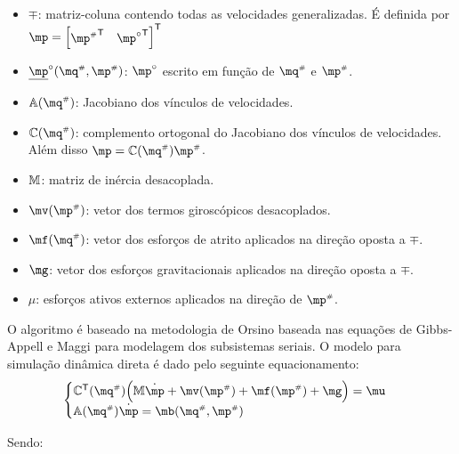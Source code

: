 \documentclass[a4paper,11pt,brazil,fleqn]{article}
\begin{document}
\begin{itemize}
\item $\mp$: matriz-coluna contendo todas as velocidades generalizadas. \'E definida por $\mp = \begin{bmatrix} {\mp\ssh}^\msT & {\mp\cir}^\msT \end{bmatrix}^\msT $
\item $\underline{\mp}\cir(\mq\ssh,\mp\ssh)$: $\mp\cir$ escrito em fun\c{c}\~ao de $\mq\ssh$ e $\mp\ssh$.
\item $\mA(\mq\ssh)$: Jacobiano dos v\'inculos de velocidades.
\item $\mC(\mq\ssh)$: complemento ortogonal do Jacobiano dos v\'inculos de velocidades. Al\'em disso $\mp = \mC(\mq\ssh) \mp\ssh$.
\item $\mathbb{M}$: matriz de in\'ercia desacoplada.
\item $\mv(\mp\ssh)$: vetor dos termos girosc\'opicos desacoplados.
\item $\mf(\mq\ssh)$: vetor dos esfor\c{c}os de atrito aplicados na dire\c{c}\~ao oposta a $\mp$.
\item $\mg$: vetor dos esfor\c{c}os gravitacionais aplicados na dire\c{c}\~ao oposta a $\mp$.
\item $\mu $: esfor\c{c}os ativos externos aplicados na dire\c{c}\~ao de $\mp\ssh$.

\end{itemize}

O algoritmo \'e baseado na metodologia de Orsino baseada nas equa\c{c}\~oes de Gibbs-Appell e Maggi para modelagem dos subsistemas seriais. O modelo para simula\c{c}\~ao din\^amica direta \'e dado pelo seguinte equacionamento:
\begin{equation} \label{eq:DinamicaDireta}
\begin{cases}
\mC^\mathsf{T}(\mq\ssh) \Big( \mM \dot{\mp} + \mv(\mp\ssh) + \mf(\mp\ssh) + \mg \Big) = \mu \\
\mA(\mq\ssh) \dot{\mp} = \mb(\mq\ssh,\mp\ssh)
\end{cases}
\end{equation}

Sendo:
\end{document}
